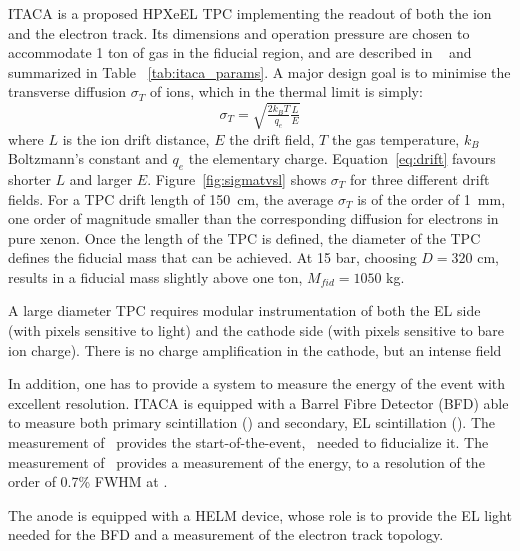 \documentclass[11pt,a4paper]{article}
\begin{document}
ITACA is a proposed HPXeEL TPC implementing the readout of both the ion and the electron track. Its dimensions and operation pressure are chosen to accommodate 1 ton of gas in the fiducial region, and are described in 
~\cite{itaca2026} and summarized in Table~ \ref{tab:itaca_params}.
 A major design goal is to minimise the transverse diffusion $\sigma_T$ of ions, which in the thermal limit is simply:
 \begin{equation}
\sigma_T =\sqrt{\tfrac{2k_BT}{q_e}\tfrac{L}{E}} 
\label{eq:drift}
\end{equation}
%
where $L$ is the ion drift distance, $E$ the drift field, $T$ the gas temperature, $k_B$ Boltzmann's constant and $q_e$ the elementary charge. Equation~\ref{eq:drift} favours shorter $L$ and larger $E$. Figure~\ref{fig:sigmatvsl} shows $\sigma_T$ for three different drift fields. For a TPC drift length of 150~cm, the average $\sigma_T$ is of the order of \SI{1}{mm}, one order of magnitude smaller than the corresponding diffusion for electrons in pure xenon. Once the length of the TPC is defined, the diameter of the TPC defines the fiducial mass that can be achieved. At 15 bar, choosing $D= 320$ cm, results in a fiducial mass slightly above one ton, $M_{fid} = 1050$ kg. 
 
A large diameter TPC requires modular instrumentation of both the EL side (with pixels sensitive to light) and the cathode side (with pixels sensitive to bare ion charge). There is no charge amplification in the cathode, but an intense field

In addition, one has to provide a system to measure the energy of the event with excellent resolution. ITACA is equipped with a Barrel Fibre Detector (BFD) able to measure both primary scintillation (\sone) and secondary, EL scintillation (\stwo). The measurement of \sone\ provides the start-of-the-event, \tz\, needed to fiducialize it. The measurement of \stwo\ provides a measurement of the energy, to a resolution 
of the order of 0.7\% FWHM at \Qbb. 

The anode is equipped with a HELM device, whose role is to provide the EL light needed for the BFD and a measurement of the electron track topology. 


\end{document}

